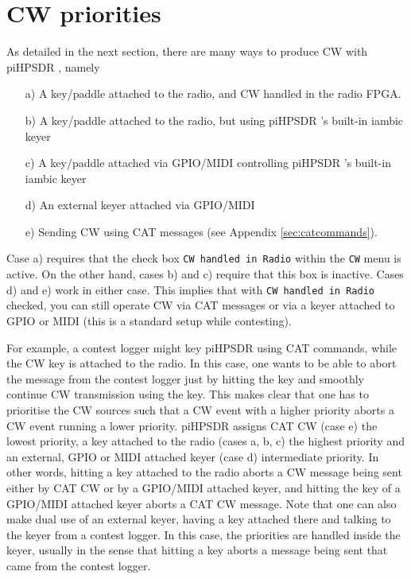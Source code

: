 \documentclass[12pt]{book}
\def\rett#1{\texttt{\color{red}#1}}
\def\bltt#1{\texttt{\color{blue}#1}}
\def\pH{pi\-HPSDR }
\begin{document}
\section{CW priorities}
As detailed in the next section, there are many ways to produce CW with \pH,
namely
\begin{itemize}
\item[a)]{A key/paddle attached to the radio, and CW handled in the radio FPGA.}
\item[b)]{A key/paddle attached to the radio, but using \pH's built-in iambic keyer}
\item[c)]{A key/paddle attached via GPIO/MIDI controlling \pH's built-in iambic keyer}
\item[d)]{An external keyer attached via GPIO/MIDI}
\item[e)]{Sending CW using CAT messages (see Appendix \ref{sec:catcommands}).}
\end{itemize}

Case a) requires that the check box \rett{CW handled in Radio} within the \bltt{CW} menu
is active. On the other hand, cases b) and c) require that this box is inactive. Cases
d) and e) work in either case. This implies that with \rett{CW handled in Radio} checked,
you can still operate CW via CAT messages or via a keyer attached to GPIO or MIDI
(this is a standard setup while contesting).

For example, a contest logger might key \pH using CAT commands, while the CW key is
attached to the radio. In this case, one wants to be able to abort the message from the contest
logger just by hitting the key and smoothly continue CW transmission using the key. This
makes clear that one has to prioritise the CW sources such that a CW event with a higher
priority aborts a CW event running a lower priority. \pH assigns CAT CW (case e)
the lowest priority, a key attached to the radio (cases a, b, c) the highest priority
and an external, GPIO or MIDI attached keyer (case d) intermediate priority. In other words,
hitting a key attached to the radio aborts a CW message being sent either by CAT CW or
by a GPIO/MIDI attached keyer, and hitting the key of a GPIO/MIDI attached keyer aborts
a CAT CW message. Note that one can also make dual use of an external keyer, having a key
attached there and talking to the keyer from a contest logger. In this case, the priorities
are handled inside the keyer, usually in the sense that hitting a key aborts a message
being sent that came from the contest logger.
\end{document}
